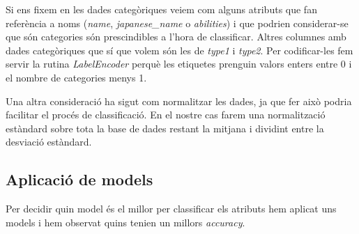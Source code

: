 \documentclass[a4paper, 11pt]{article}
\begin{document}
    Si ens fixem en les dades categòriques veiem com alguns atributs que fan referència a noms (\textit{name}, \textit{japanese\_name} o \textit{abilities}) i que podrien considerar-se que són categories són prescindibles a l'hora de classificar. Altres columnes amb dades categòriques que sí que volem són les de \textit{type1} i \textit{type2}. Per codificar-les fem servir la rutina \textit{LabelEncoder} perquè les etiquetes prenguin valors enters entre 0 i el nombre de categories menys 1.

    Una altra consideració ha sigut com normalitzar les dades, ja que fer això podria facilitar el procés de classificació. En el nostre cas farem una normalització estàndard sobre tota la base de dades restant la mitjana i dividint entre la desviació estàndard.

    \newpage
    \subsection{Aplicació de models}
    Per decidir quin model és el millor per classificar els atributs hem aplicat uns models i hem observat quins tenien un millors \textit{accuracy}.
\end{document}
